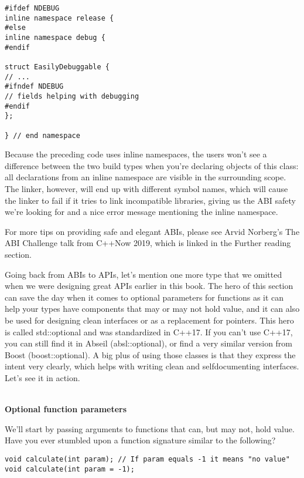 \begin{lstlisting}[style=styleCXX]
#ifdef NDEBUG
inline namespace release {
#else
inline namespace debug {
#endif

struct EasilyDebuggable {
// ...
#ifndef NDEBUG
// fields helping with debugging
#endif
};

} // end namespace
\end{lstlisting}

Because the preceding code uses inline namespaces, the users won't see a difference between the two build types when you're declaring objects of this class: all declarations from an inline namespace are visible in the surrounding scope. The linker, however, will end up with different symbol names, which will cause the linker to fail if it tries to link incompatible libraries, giving us the ABI safety we're looking for and a nice error message mentioning the inline namespace.

For more tips on providing safe and elegant ABIs, please see Arvid Norberg's The ABI Challenge talk from C++Now 2019, which is linked in the Further reading section.


Going back from ABIs to APIs, let's mention one more type that we omitted when we were designing great APIs earlier in this book. The hero of this section can save the day when it comes to optional parameters for functions as it can help your types have components that may or may not hold value, and it can also be used for designing clean interfaces or as a replacement for pointers. This hero is called std::optional and was standardized in C++17. If you can't use C++17, you can still find it in Abseil (absl::optional), or find a very similar version from Boost (boost::optional). A big plus of using those classes is that they express the intent very clearly, which helps with writing clean and selfdocumenting interfaces. Let's see it in action.

\hspace*{\fill} \\ %
\noindent
\textbf{Optional function parameters}

We'll start by passing arguments to functions that can, but may not, hold value. Have you ever stumbled upon a function signature similar to the following?

\begin{lstlisting}[style=styleCXX]
void calculate(int param); // If param equals -1 it means "no value"
void calculate(int param = -1);
\end{lstlisting}

